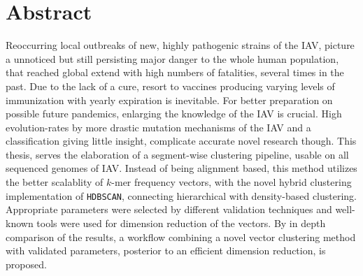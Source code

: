 \chapter*{Abstract}

Reoccurring local outbreaks of new, highly pathogenic strains of the \gls{IAV}, picture a unnoticed but still persisting major danger to the whole human population, that reached global extend with high numbers of fatalities, several times in the past. Due to the lack of a cure, resort to vaccines producing varying levels of immunization with yearly expiration is inevitable. For better preparation on possible future pandemics, enlarging the knowledge of the \gls{IAV} is crucial. High evolution-rates by more drastic mutation mechanisms of the \gls{IAV} and a classification giving little insight, complicate accurate novel research though. This thesis, serves the elaboration of a segment-wise clustering pipeline, usable on all sequenced genomes of \gls{IAV}. Instead of being alignment based, this method utilizes the better scalablity of $k$-mer frequency vectors, with the novel hybrid clustering implementation of \texttt{HDBSCAN}, connecting hierarchical with density-based clustering. Appropriate parameters were selected by different validation techniques and well-known tools were used for dimension reduction of the vectors. By in depth comparison of the results, a workflow combining a novel vector clustering method with validated parameters, posterior to an efficient dimension reduction, is proposed. 